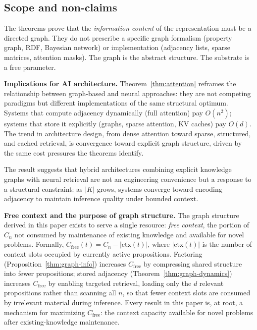 \documentclass[11pt]{article}
\theoremstyle{definition}
\begin{document}
\subsection{Scope and non-claims}

The theorems prove that the \emph{information content} of the
representation must be a directed graph. They do not prescribe a
specific graph formalism (property graph, RDF, Bayesian network) or
implementation (adjacency lists, sparse matrices, attention masks). The
graph is the abstract structure. The substrate is a free parameter.

\textbf{Implications for AI architecture.}
Theorem~\ref{thm:attention} reframes the relationship between
graph-based and neural approaches: they are not competing paradigms but
different implementations of the same structural optimum. Systems that
compute adjacency dynamically (full attention) pay $O(n^2)$; systems
that store it explicitly (graphs, sparse attention, KV caches) pay
$O(d)$. The trend in architecture design, from dense attention toward
sparse, structured, and cached retrieval, is convergence toward
explicit graph structure, driven by the same cost pressures the theorems
identify.

The result suggests that hybrid architectures combining explicit
knowledge graphs with neural retrieval are not an engineering
convenience but a response to a structural constraint: as $|K|$ grows,
systems converge toward encoding adjacency to maintain inference quality under bounded
context.

\textbf{Free context and the purpose of graph structure.}
The graph structure derived in this paper exists to serve a single
resource: \emph{free context}, the portion of $C_n$ not consumed by
maintenance of existing knowledge and available for novel problems.
Formally, $C_{\mathrm{free}}(t) = C_n - |\mathrm{ctx}(t)|$,
where $|\mathrm{ctx}(t)|$ is the number of context slots occupied by
currently active propositions. Factoring
(Proposition~\ref{thm:graph-info}) increases $C_{\mathrm{free}}$ by
compressing shared structure into fewer propositions; stored adjacency
(Theorem~\ref{thm:graph-dynamics}) increases $C_{\mathrm{free}}$ by
enabling targeted retrieval, loading only the $d$ relevant propositions
rather than scanning all $n$, so that fewer context slots are consumed
by irrelevant material during inference. Every result in this paper is, at root,
a mechanism for maximizing $C_{\mathrm{free}}$: the context capacity
available for novel problems after existing-knowledge maintenance.
\end{document}
